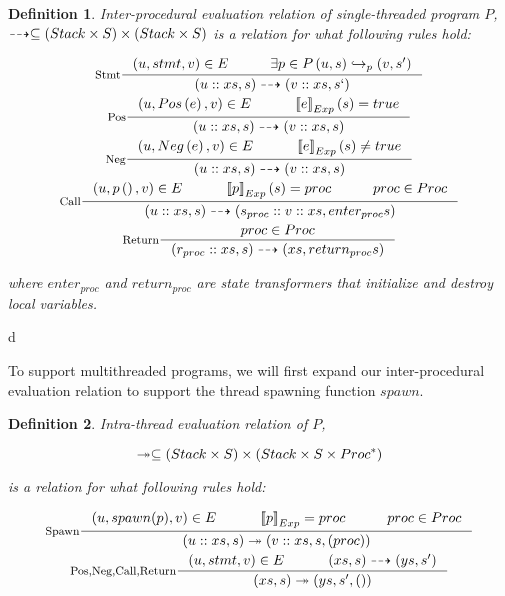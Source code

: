 \documentclass[..thesis.tex]{subfiles}
\newtheorem{defin}{Definition}[section]
\begin{document}
\begin{defin}

Inter-procedural evaluation relation of single-threaded program $P$, 
$\dashrightarrow \subseteq \left( Stack \times S \right) \times \left( Stack \times S \right)$ 
is a relation for what following rules hold:

\addtolength{\jot}{2em}
\begin{gather*}
  \inference[Stmt]{\lp u, stmt, v \rp \in E  \separ \exists p \in P  \lp u, s \rp \intraproc_p \lp v, s' \rp }{ \lp u :: xs, s \rp \interproc \lp v :: xs, s` \rp} \\
  \inference[Pos]{ \lp u, Pos \lp e \rp, v \rp \in E \separ   \lllb e \rrrb_{Exp} \lp s \rp = true  }{\lp u :: xs , s \rp \interproc \lp v :: xs, s \rp} \\ 
  \inference[Neg]{ \lp u, Neg \lp e \rp, v \rp  \in E \separ   \lllb e \rrrb_{Exp} \lp s \rp \neq true  }{\lp u :: xs , s \rp \interproc \lp v :: xs, s \rp} \\
  \inference[Call]{ \lp u, p\lp\rp , v \rp  \in E \separ  \lllb p \rrrb_{Exp} \lp s \rp = proc \separ proc \in Proc }{\lp u :: xs , s \rp \interproc \lp s_{proc} :: v :: xs, enter_{proc} s \rp} \\
  \inference[Return] { proc \in Proc} { \lp r_{proc}::xs , s \rp \interproc \lp xs, return_{proc} s \rp}
\end{gather*}
\addtolength{\jot}{-2em}

where $enter_{proc}$ and $return_{proc}$ are state transformers that initialize and destroy local variables.

\end{defin}d 


To support multithreaded programs, we will first expand our inter-procedural evaluation relation to support the thread spawning function $spawn$.

\begin{defin}

  Intra-thread evaluation relation of $P$,

  \begin{equation*}
    \twoheadrightarrow \subseteq  \left( Stack \times S \right) \times \left( Stack \times S \times Proc^\ast \right)
  \end{equation*}

  is a relation for what following rules hold:

  \addtolength{\jot}{2em}
  \begin{gather*}
    \inference[Spawn]{\lp u, spawn(p), v \rp \in E  \separ  \lllb p \rrrb_{Exp} = proc \separ proc \in Proc  }{ \lp u :: xs, s \rp \intrathread \lp v :: xs, s, (proc) \rp} \\
    \inference[Pos,Neg,Call,Return] {\lp u, stmt, v \rp \in E \separ \lp xs , s \rp \interproc \lp ys, s' \rp }{ \lp xs , s \rp \intrathread \lp ys, s', \lp \rp \rp}
  \end{gather*}
  \addtolength{\jot}{-2em}

\end{defin}
\end{document}
